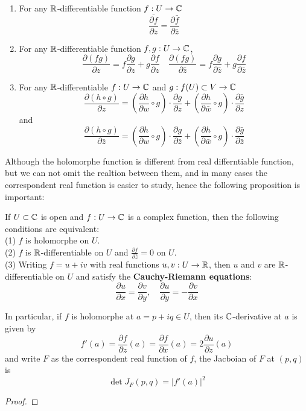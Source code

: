 \documentclass[12pt,a4paper]{article}
\begin{document}
\begin{enumerate}
    \item For any \(\mathbb{R}\)-differentiable function \(f:U \to \mathbb{C}\)
    \[\overline{\frac{\partial f}{\partial z}} = \frac{\partial \bar{f}}{\partial \bar{z}}\]
    \item For any \(\mathbb{R}\)-differentiable function \(f,g:U \to \mathbb{C}\),
    \[\frac{\partial (fg)}{\partial z} = f \frac{\partial g}{\partial z} + g \frac{\partial f}{\partial z} \quad \frac{\partial (fg)}{\partial \bar{z}} = f \frac{\partial g}{\partial \bar{z}} + g \frac{\partial f}{\partial \bar{z}}\]
    \item For any \(\mathbb{R}\)-differentiable \(f:U \to \mathbb{C}\) and \(g: f(U) \subset V \to \mathbb{C}\)
    \[\frac{\partial (h \circ g)}{\partial z} = (\frac{\partial h}{\partial w}\circ g) \cdot \frac{\partial g}{\partial z} + (\frac{\partial h}{\partial \bar{w}}\circ g) \cdot \frac{\partial \bar{g}}{\partial z}\]
    and 
    \[\frac{\partial (h \circ g)}{\partial \bar{z}} = (\frac{\partial h}{\partial w}\circ g) \cdot \frac{\partial g}{\partial \bar{z}} + (\frac{\partial h}{\partial \bar{w}}\circ g) \cdot \frac{\partial \bar{g}}{\partial \bar{z}}\]

\end{enumerate}

Although the holomorphe function is different from real differntiable function, but we can not omit the realtion between them, and in many cases the correspondent real function is easier to study, hence the following proposition is important:
\begin{proposition}
    If \(U \subset \mathbb{C}\) is open and \(f:U \to \mathbb{C}\) is a complex function, then the following conditions are equivalent:\\
    (1) \(f\) is holomorphe on \(U\).\\

    (2) \(f\) is \(\mathbb{R}\)-differentiable on \(U\) and \(\frac{\partial f}{\partial \bar{z}} = 0\) on \(U\).\\

    (3) Writing \(f = u + iv\) with real functions \(u,v:U \to \mathbb{R}\), then \(u\) and \(v\) are \(\mathbb{R}\)-differentiable on \(U\) and satisfy the \textbf{Cauchy-Riemann equations}:
    \[\frac{\partial u}{\partial x} = \frac{\partial v}{\partial y}, \quad \frac{\partial u}{\partial y} = -\frac{\partial v}{\partial x}\]

    In particular, if \(f\) is holomorphe at \(a = p+iq \in U\), then its \(\mathbb{C}\)-derivative at \(a\) is given by
    \[f'(a) = \frac{\partial f}{\partial z}(a) = \frac{\partial f}{\partial x}(a) = 2 \frac{\partial u}{\partial z}(a)\]
    and write \(F\) as the correspondent real function of \(f\), the Jacboian of \(F\) at \((p,q)\) is
    \[\det J_F(p,q) = |f'(a)|^2\]
\end{proposition}
\begin{proof}
    
\end{proof}
\end{document}
